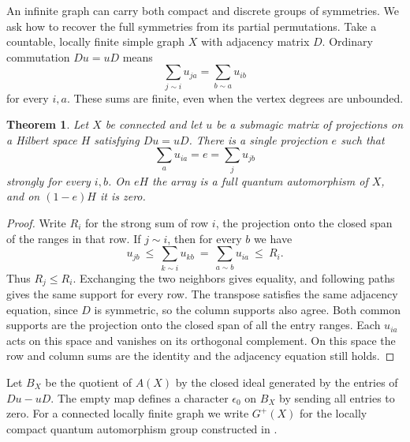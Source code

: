 \documentclass[11pt,a4paper]{article}
\newtheorem{thm}{Theorem}[section]
\begin{document}
An infinite graph can carry both compact and discrete groups of symmetries. We ask how to recover the full symmetries from its partial permutations. Take a countable, locally finite simple graph $X$ with adjacency matrix $D$. Ordinary commutation $Du=uD$ means
\[
 \sum_{j\sim i}u_{ja}=\sum_{b\sim a}u_{ib}
\]
for every $i,a$. These sums are finite, even when the vertex degrees are unbounded.

\begin{thm}\label{globalsupport}
Let $X$ be connected and let $u$ be a submagic matrix of projections on a Hilbert space $H$ satisfying $Du=uD$. There is a single projection $e$ such that
\[
 \sum_a u_{ia}=e=\sum_j u_{jb}
\]
strongly for every $i,b$. On $eH$ the array is a full quantum automorphism of $X$, and on $(1-e)H$ it is zero.
\end{thm}
\begin{proof}
Write $R_i$ for the strong sum of row $i$, the projection onto the closed span of the ranges in that row. If $j\sim i$, then for every $b$ we have
\[
 u_{jb}\ \leq\ \sum_{k\sim i}u_{kb}
       \ =\ \sum_{a\sim b}u_{ia}\ \leq\ R_i .
\]
Thus $R_j\leq R_i$. Exchanging the two neighbors gives equality, and following paths gives the same support for every row. The transpose satisfies the same adjacency equation, since $D$ is symmetric, so the column supports also agree. Both common supports are the projection onto the closed span of all the entry ranges. Each $u_{ia}$ acts on this space and vanishes on its orthogonal complement. On this space the row and column sums are the identity and the adjacency equation still holds.
\end{proof}

Let $B_X$ be the quotient of $A(X)$ by the closed ideal generated by the entries of $Du-uD$. The empty map defines a character $\epsilon_0$ on $B_X$ by sending all entries to zero. For a connected locally finite graph we write $G^+(X)$ for the locally compact quantum automorphism group constructed in \cite{rv}.
\end{document}
